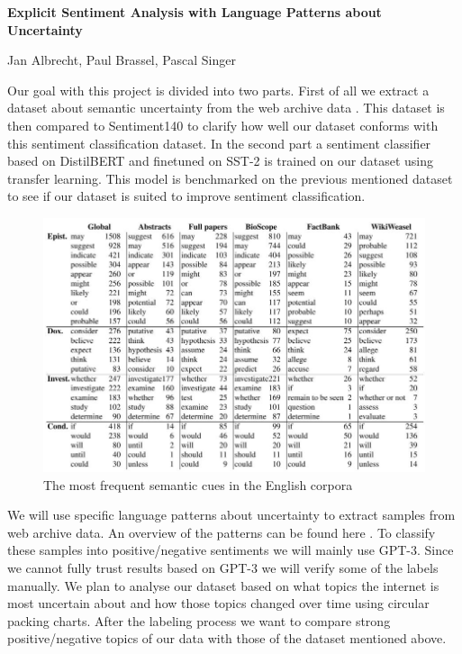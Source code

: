 \documentclass[a4paper,12pt,numbers=enddot]{scrartcl}
\begin{document}
\singlespacing

\begin{Large}
\begin{center}
\textbf{Explicit Sentiment Analysis with Language Patterns about Uncertainty}
\end{center}
\end{Large}
\begin{center}
Jan Albrecht, Paul Brassel, Pascal Singer
\end{center}

Our goal with this project is divided into two parts. First of all we extract a dataset about semantic uncertainty from the web archive data \citep{Kiesel2018}. This dataset is then compared to Sentiment140 \citep{Sent140} to clarify how well our dataset conforms with this sentiment classification dataset. In the second part a sentiment classifier based on DistilBERT and finetuned on SST-2 \citep{DistilBert} is trained on our dataset using transfer learning. This model is benchmarked on the previous mentioned dataset to see if our dataset is suited to improve sentiment classification.
\begin{figure}[htb]
	\centering
	\includegraphics[scale=0.6]{language_patterns.png}
	\caption{The most frequent semantic cues in the English corpora \citep{vincze2014uncertainty}}
\end{figure}

We will use specific language patterns about uncertainty to extract samples from web archive data. An overview of the patterns can be found here \citep[p. 43]{vincze2014uncertainty}. To classify these samples into positive/negative sentiments we will mainly use GPT-3. Since we cannot fully trust results based on GPT-3 we will verify some of the labels manually. We plan to analyse our dataset based on what topics the internet is most uncertain about and how those topics changed over time using circular packing charts. After the labeling process we want to compare strong positive/negative topics of our data with those of the dataset mentioned above.
\\
\end{document}
